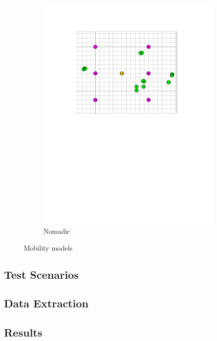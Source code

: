 \documentclass[conference]{IEEEtran}
\begin{document}
\begin{figure}
\begin{subfigure}[b]{0.22\textwidth}
        \includegraphics[trim= 100 350 100 90, clip, width=\textwidth]{RPGM_Model.pdf}
        \caption{Nomadic}
        \label{fig:nomadic}
    \end{subfigure}
    \caption{Mobility models}\label{fig:mobility_models}
\end{figure}

\subsection{Test Scenarios}

\subsection{Data Extraction} 

\subsection{Results}
\end{document}
